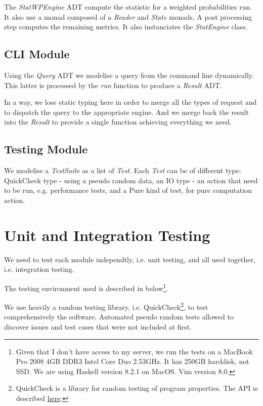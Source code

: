 \documentclass[12pt,a4paper,article]{memoir} %
\begin{document}
The \emph{StatWPEngine} ADT compute the statistic for a weighted
probabilities run. It also use a monad composed of a \emph{Reader}
and \emph{State} monads. A post processing step computes
the remaining metrics. It also instanciates the \emph{StatEngine} class.

\subsection{CLI Module}
Using the \emph{Query} ADT we modelise a query from the command line
dynamically. This latter is processed by the \emph{run} function to 
produce a  \emph{Result} ADT.

In a way, we lose static typing here in order to merge all the types of 
request and to dispatch the query to the appropriate engine. And we merge
back the result into the \emph{Result} to provide a single function achieving
everything we need.

\subsection{Testing Module}
We modelise a \emph{TestSuite} as a list of \emph{Test}.
Each \emph{Test} can be of different type: QuickCheck type - 
using a pseudo random data, 
an IO type - an action that need to be run, e.g. performance tests, 
and a Pure kind of test, for pure computation action.

\section{Unit and Integration Testing}
We need to test each module independtly, i.e. unit testing, and all used 
together, i.e. integration testing.

The testing environment used is described in below\footnote{
Given that I don't have access to my server, 
we run the tests on a MacBook Pro 2008 4GB DDR3 Intel Core Duo 2.53GHz.
It has 250GB harddisk, not SSD. 
We are using Haskell version 8.2.1 on MacOS. Vim version 8.0.
}.

We use heavily a random testing library, i.e. QuickCheck\footnote{
QuickCheck is a library for random testing of program properties.
The API is described 
\href{http://hackage.haskell.org/package/QuickCheck-2.10.0.1/docs/Test-QuickCheck.html}{here}.
}, to test comprehensively the software.
Automated pseudo random tests allowed to discover issues and
test cases that were not included at first.
\end{document}
